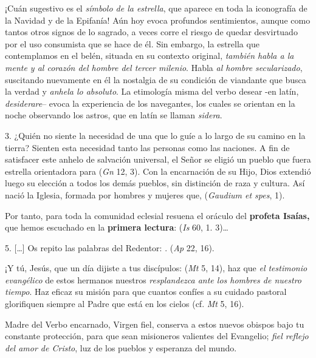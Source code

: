 \begin{body}
					¡Cuán sugestivo es el \emph{símbolo de la estrella}, que aparece en toda la iconografía de la Navidad y de la Epifanía! Aún hoy evoca profundos sentimientos, aunque como tantos otros signos de lo sagrado, a veces corre el riesgo de quedar desvirtuado por el uso consumista que se hace de él. Sin embargo, la estrella que contemplamos en el belén, situada en su contexto original, \emph{también habla a la mente y al corazón del hombre del tercer milenio}. Habla \emph{al hombre secularizado}, suscitando nuevamente en él la nostalgia de su condición de viandante que busca la verdad y \emph{anhela lo absoluto}. La etimología misma del verbo desear -en latín, \emph{desiderare}-- evoca la experiencia de los navegantes, los cuales se orientan en la noche observando los astros, que en latín se llaman \emph{sidera}.
					
					3. ¿Quién no siente la necesidad de una  que lo guíe a lo largo de su camino en la tierra? Sienten esta necesidad tanto las personas como las naciones. A fin de satisfacer este anhelo de salvación universal, el Señor se eligió un pueblo que fuera estrella orientadora para  (\emph{Gn} 12, 3). Con la encarnación de su Hijo, Dios extendió luego su elección a todos los demás pueblos, sin distinción de raza y cultura. Así nació la Iglesia, formada por hombres y mujeres que,  (\emph{Gaudium et spes}, 1).
					
					Por tanto, para toda la comunidad eclesial resuena el oráculo del \textbf{profeta Isaías,} que hemos escuchado en la \textbf{primera lectura}:  (\emph{Is} 60, 1. 3)\ldots{}
					
					5. {[}\ldots{}{]} Os repito las palabras del Redentor: .  (\emph{Ap} 22, 16).
					
					¡Y tú, Jesús, que un día dijiste a tus discípulos:  (\emph{Mt} 5, 14), haz que \emph{el testimonio evangélico} de estos hermanos nuestros \emph{resplandezca ante los hombres de nuestro tiempo}. Haz eficaz su misión para que cuantos confíes a su cuidado pastoral glorifiquen siempre al Padre que está en los cielos (cf. \emph{Mt} 5, 16).
					
					Madre del Verbo encarnado, Virgen fiel, conserva a estos nuevos obispos bajo tu constante protección, para que sean misioneros valientes del Evangelio; \emph{fiel reflejo del amor de Cristo}, luz de los pueblos y esperanza del mundo.
				\end{body}
			
